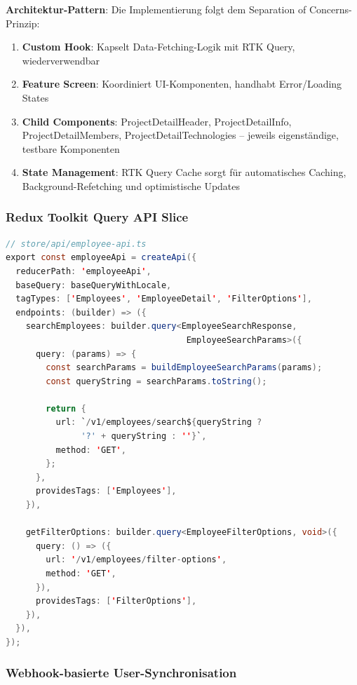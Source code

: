 \textbf{Architektur-Pattern}: Die Implementierung folgt dem Separation of Concerns-Prinzip:
\begin{enumerate}[noitemsep]
    \item \textbf{Custom Hook}: Kapselt Data-Fetching-Logik mit RTK Query, wiederverwendbar
    \item \textbf{Feature Screen}: Koordiniert UI-Komponenten, handhabt Error/Loading States
    \item \textbf{Child Components}: ProjectDetailHeader, ProjectDetailInfo, ProjectDetailMembers, ProjectDetailTechnologies -- jeweils eigenständige, testbare Komponenten
    \item \textbf{State Management}: RTK Query Cache sorgt für automatisches Caching, Background-Refetching und optimistische Updates
\end{enumerate}

\subsubsection{Redux Toolkit Query API Slice}

\begin{lstlisting}[language=Java, caption=RTK Query API Slice für Employee-Suche, label=lst:rtk_query_detail]
// store/api/employee-api.ts
export const employeeApi = createApi({
  reducerPath: 'employeeApi',
  baseQuery: baseQueryWithLocale,
  tagTypes: ['Employees', 'EmployeeDetail', 'FilterOptions'],
  endpoints: (builder) => ({
    searchEmployees: builder.query<EmployeeSearchResponse, 
                                    EmployeeSearchParams>({
      query: (params) => {
        const searchParams = buildEmployeeSearchParams(params);
        const queryString = searchParams.toString();
        
        return {
          url: `/v1/employees/search${queryString ? 
               '?' + queryString : ''}`,
          method: 'GET',
        };
      },
      providesTags: ['Employees'],
    }),
    
    getFilterOptions: builder.query<EmployeeFilterOptions, void>({
      query: () => ({
        url: '/v1/employees/filter-options',
        method: 'GET',
      }),
      providesTags: ['FilterOptions'],
    }),
  }),
});
\end{lstlisting}

\subsubsection{Webhook-basierte User-Synchronisation}


